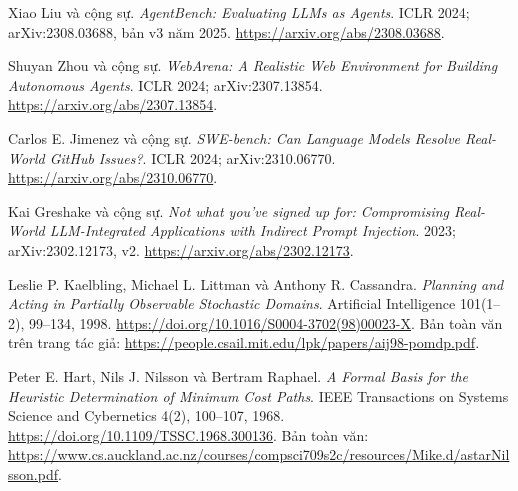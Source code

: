  Xiao Liu và cộng sự.
\emph{AgentBench: Evaluating LLMs as Agents}.
ICLR 2024; arXiv:2308.03688, bản v3 năm 2025.
\url{https://arxiv.org/abs/2308.03688}.

 Shuyan Zhou và cộng sự.
\emph{WebArena: A Realistic Web Environment for Building Autonomous Agents}.
ICLR 2024; arXiv:2307.13854.
\url{https://arxiv.org/abs/2307.13854}.

 Carlos E. Jimenez và cộng sự.
\emph{SWE-bench: Can Language Models Resolve Real-World GitHub Issues?}.
ICLR 2024; arXiv:2310.06770.
\url{https://arxiv.org/abs/2310.06770}.

 Kai Greshake và cộng sự.
\emph{Not what you've signed up for: Compromising Real-World LLM-Integrated
Applications with Indirect Prompt Injection}.
2023; arXiv:2302.12173, v2.
\url{https://arxiv.org/abs/2302.12173}.

 Leslie P. Kaelbling, Michael L. Littman và Anthony R. Cassandra.
\emph{Planning and Acting in Partially Observable Stochastic Domains}.
Artificial Intelligence 101(1--2), 99--134, 1998.
\url{https://doi.org/10.1016/S0004-3702(98)00023-X}.
Bản toàn văn trên trang tác giả:
\url{https://people.csail.mit.edu/lpk/papers/aij98-pomdp.pdf}.

 Peter E. Hart, Nils J. Nilsson và Bertram Raphael.
\emph{A Formal Basis for the Heuristic Determination of Minimum Cost Paths}.
IEEE Transactions on Systems Science and Cybernetics 4(2), 100--107, 1968.
\url{https://doi.org/10.1109/TSSC.1968.300136}.
Bản toàn văn:
\url{https://www.cs.auckland.ac.nz/courses/compsci709s2c/resources/Mike.d/astarNilsson.pdf}.
